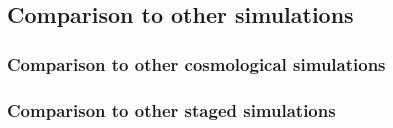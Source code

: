 \subsection{Comparison to other simulations}
\subsubsection{Comparison to other cosmological simulations}
% 
% 
% 
% 
% 
% 
% 
% 
\subsubsection{Comparison to other staged simulations}
% 
% 
% 
% 
% 
% 



% 
% 
% 
% 
% 
% 
% 
% 
% 
% 
% 
% 
% 
